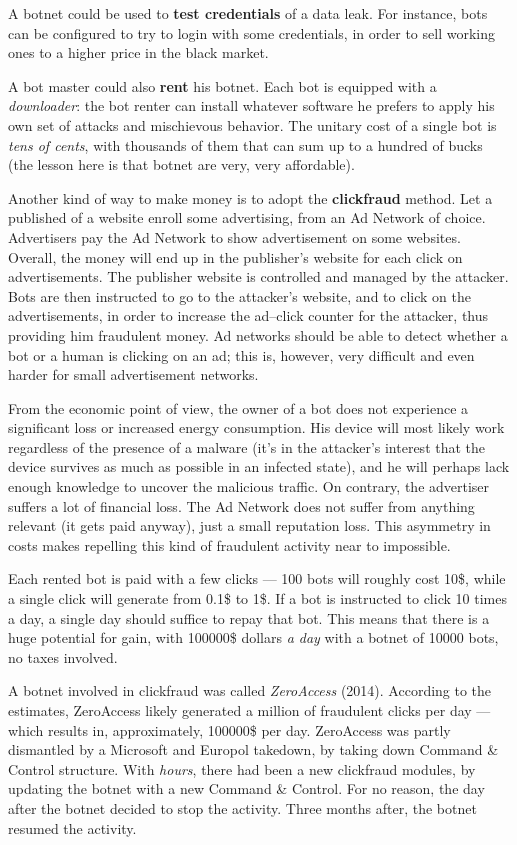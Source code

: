 \documentclass[10pt]{extreport}
\begin{document}
A botnet could be used to \textbf{test credentials} of a data leak. For instance,
bots can be configured to try to login with some credentials, in order to sell
working ones to a higher price in the black market.

A bot master could also \textbf{rent} his botnet. Each bot is equipped with a
\emph{downloader}: the bot renter can install whatever software he prefers to
apply his own set of attacks and mischievous behavior. The unitary cost of a
single bot is \emph{tens of cents}, with thousands of them that can sum up to a
hundred of bucks (the lesson here is that botnet are very, very affordable).

Another kind of way to make money is to adopt the \textbf{clickfraud} method.
Let a published of a website enroll some advertising, from an Ad Network of
choice. Advertisers pay the Ad Network to show advertisement on some websites.
Overall, the money will end up in the publisher's website for each click on
advertisements. The publisher website is controlled and managed by the
attacker. Bots are then instructed to go to the attacker's website, and to
click on the advertisements, in order to increase the ad--click counter for the
attacker, thus providing him fraudulent money. Ad networks should be able to
detect whether a bot or a human is clicking on an ad; this is, however, very
difficult and even harder for small advertisement networks.

From the economic point of view, the owner of a bot does not experience a
significant loss or increased energy consumption. His device will most likely
work regardless of the presence of a malware (it's in the attacker's interest
that the device survives as much as possible in an infected state), and he will
perhaps lack enough knowledge to uncover the malicious traffic. On contrary, the
advertiser suffers a lot of financial loss. The Ad Network does not suffer from
anything relevant (it gets paid anyway), just a small reputation loss. This
asymmetry in costs makes repelling this kind of fraudulent activity near to
impossible.

Each rented bot is paid with a few clicks --- 100 bots will roughly cost 10\$,
while a single click will generate from 0.1\$ to 1\$. If a bot is instructed to
click 10 times a day, a single day should suffice to repay that bot. This means
that there is a huge potential for gain, with 100000\$ dollars \emph{a day}
with a botnet of 10000 bots, no taxes involved.

A botnet involved in clickfraud was called \emph{ZeroAccess} (2014). According
to the estimates, ZeroAccess likely generated a million of fraudulent clicks
per day --- which results in, approximately, 100000\$ per day. ZeroAccess was
partly dismantled by a Microsoft and Europol takedown, by taking down Command
\& Control structure. With \emph{hours}, there had been a new clickfraud
modules, by updating the botnet with a new Command \& Control. For no reason,
the day after the botnet decided to stop the activity. Three months after, the
botnet resumed the activity.
\end{document}
